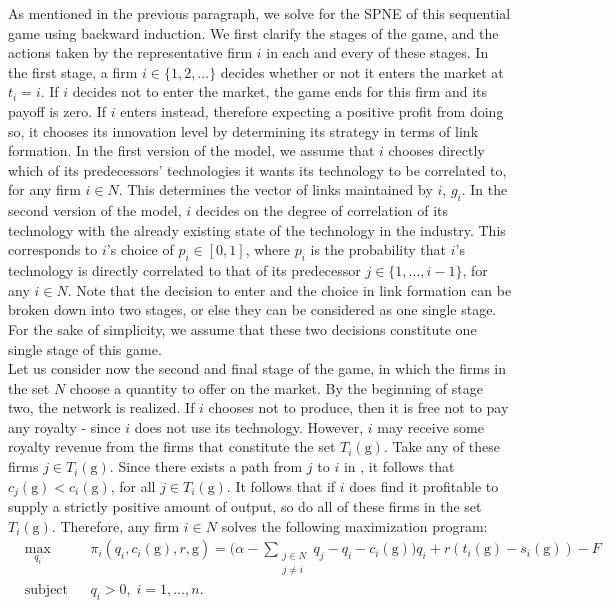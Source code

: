 \documentclass[11pt]{article}
\begin{document}
\indent As mentioned in the previous paragraph, we solve for the SPNE of this sequential game using backward induction. We first clarify the stages of the game, and the actions taken by the representative firm $i$ in each and every of these stages. In the first stage, a firm $i\in \{1,2,...\}$ decides whether or not it enters the market at $t_i=i$. If $i$ decides not to enter the market, the game ends for this firm and its payoff is zero. If $i$ enters instead, therefore expecting a positive profit from doing so, it chooses its innovation level by determining its strategy in terms of link formation. In the first version of the model, we assume that $i$ chooses directly which of its predecessors' technologies it wants its technology to be correlated to, for any firm $i\in N$. This determines the vector of links maintained by $i$, $g_i$. In the second version of the model, $i$ decides on the degree of correlation of its technology with the already existing state of the technology in the industry. This corresponds to $i$'s choice of $p_i\in [0,1]$, where $p_i$ is the probability that $i$'s technology is directly correlated to that of its predecessor $j\in \{1,...,i-1\}$, for any $i\in N$. Note that the decision to enter and the choice in link formation can be broken down into two stages, or else they can be considered as one single stage. For the sake of simplicity, we assume that these two decisions constitute one single stage of this game. \\

\indent Let us consider now the second and final stage of the game, in which the firms in the set $N$ choose a quantity to offer on the market. By the beginning of stage two, the network  is realized. If $i$ chooses not to produce, then it is free not to pay any royalty - since $i$ does not use its technology. However, $i$ may receive some royalty revenue from the firms that constitute the set $T_i(\text{g})$. Take any of these firms $j\in T_i(\text{g})$. Since there exists a path from $j$ to $i$ in , it follows that $c_j(\text{g})<c_i(\text{g})$, for all $j\in T_i(\text{g})$. It follows that if $i$ does find it profitable to supply a strictly positive amount of output, so do all of these firms in the set $T_i(\text{g})$. Therefore, any firm $i\in N$ solves the following maximization program: 
\begin{equation}
\begin{aligned}
& \max_{q_i} && \pi_i(q_i, c_i(\text{g}), r, \text{g})= \Bigg(\alpha - \sum_{\substack{j\in N \\ j\neq i}} q_j - q_i - c_i(\text{g})\Bigg) q_i + r(t_i(\text{g})-s_i(\text{g}))-F\\
& \text{subject to} && q_i> 0, \;  i=1, \ldots, n.
\end{aligned}\label{program}
\end{equation}
\end{document}
